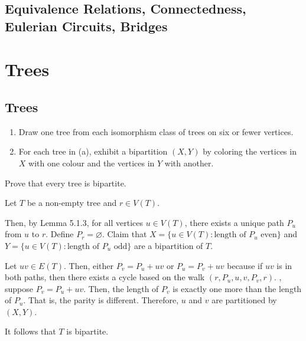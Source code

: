 \documentclass[class=math239,notes,tikz]{agony}
\begin{document}
\setcounter{subsection}{9}
\subsection{Equivalence Relations, Connectedness, Eulerian Circuits, Bridges}

\section{Trees}

\subsection{Trees}

\begin{xca}
  \begin{enumerate}
    \item Draw one tree from each isomorphism class of trees on six or fewer vertices.
    \item For each tree in (a), exhibit a bipartition $(X,Y)$ by coloring the vertices
          in $X$ with one colour and the vertices in $Y$ with another.
  \end{enumerate}
\end{xca}

\begin{xca}
  Prove that every tree is bipartite.
\end{xca}
\begin{prf}
  Let $T$ be a non-empty tree and $r \in V(T)$.

  Then, by Lemma 5.1.3, for all vertices $u \in V(T)$,
  there exists a unique path $P_u$ from $u$ to $r$.
  Define $P_r = \varnothing$.
  Claim that $X = \{ u \in V(T) : \text{length of $P_u$ even} \}$
  and $Y = \{ u \in V(T) : \text{length of $P_u$ odd} \}$
  are a bipartition of $T$.

  Let $uv \in E(T)$.
  Then, either $P_v = P_u + uv$ or $P_u = P_v + uv$
  because if $uv$ is in both paths, then there exists a cycle
  based on the walk $(r,P_u,u,v,P_v,r)$.
  \WLOG, suppose $P_v = P_u + uv$.
  Then, the length of $P_v$ is exactly one more than the length of $P_u$.
  That is, the parity is different.
  Therefore, $u$ and $v$ are partitioned by $(X,Y)$.

  It follows that $T$ is bipartite.
\end{prf}
\end{document}
